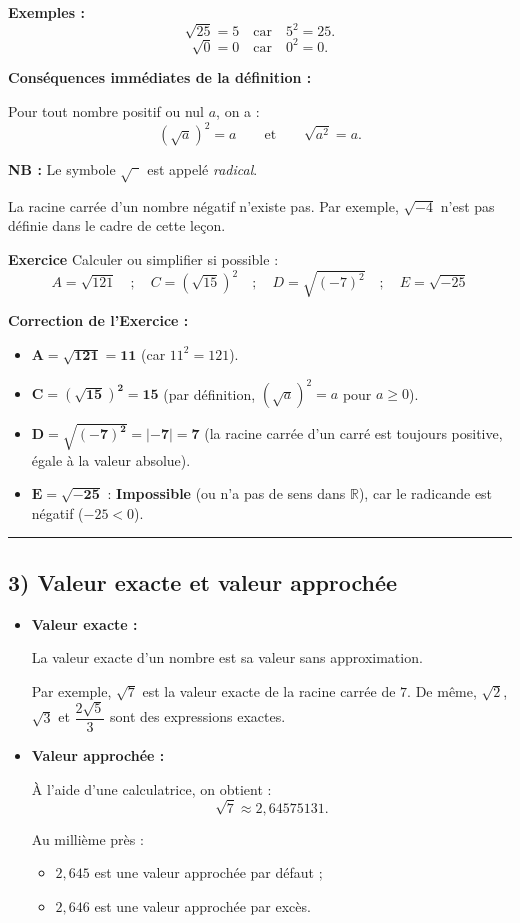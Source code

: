 \documentclass[12pt,a4paper]{article}
\begin{document}
\textbf{Exemples :}
\[
\sqrt{25}=5 \quad \text{car} \quad 5^2=25.
\]
\[
\sqrt{0}=0 \quad \text{car} \quad 0^2=0.
\]

\noindent \textbf{Conséquences immédiates de la définition :}

Pour tout nombre positif ou nul $a$, on a :
\[
(\sqrt{a})^2=a
\qquad \text{et} \qquad
\sqrt{a^2}=a.
\]

\noindent \textbf{NB :}
Le symbole $\sqrt{\phantom{a}}$ est appelé \textit{radical}.

La racine carrée d'un nombre négatif n'existe pas. Par exemple, $\sqrt{-4}$
n'est pas définie dans le cadre de cette leçon.

\noindent \textbf{Exercice } Calculer ou simplifier si possible : 
\[
A = \sqrt{121} \quad ; \quad C = (\sqrt{15})^2 \quad ; \quad D = \sqrt{(-7)^2} \quad ; \quad E = \sqrt{-25}
\]

\vspace{0.3cm}
\noindent \textbf{Correction de l'Exercice :}
\begin{itemize}
    \item $\mathbf{A = \sqrt{121} = 11}$ (car $11^2 = 121$).
    \item $\mathbf{C = (\sqrt{15})^2 = 15}$ (par définition, $(\sqrt{a})^2 = a$ pour $a \ge 0$).
    \item $\mathbf{D = \sqrt{(-7)^2} = |-7| = 7}$ (la racine carrée d'un carré est toujours positive, égale à la valeur absolue).
    \item $\mathbf{E = \sqrt{-25}}$ : \textbf{Impossible} (ou n'a pas de sens dans $\mathbb{R}$), car le radicande est négatif ($-25 < 0$).
\end{itemize}

\vspace{0.4cm}
\hrule
\vspace{0.4cm}
\subsection*{\color{myred} 3) Valeur exacte et valeur approchée}

\begin{itemize}
    \item \textbf{Valeur exacte :}

    La valeur exacte d'un nombre est sa valeur sans approximation.

    Par exemple, $\sqrt{7}$ est la valeur exacte de la racine carrée
    de $7$. De même, $\sqrt{2}$, $\sqrt{3}$ et
    $\dfrac{2\sqrt{5}}{3}$ sont des expressions exactes.

    \item \textbf{Valeur approchée :}

    À l'aide d'une calculatrice, on obtient :
    \[
    \sqrt{7}\approx 2{,}64575131.
    \]

    Au millième près :
    \begin{itemize}
        \item $2{,}645$ est une valeur approchée par défaut ;
        \item $2{,}646$ est une valeur approchée par excès.
    \end{itemize}
\end{itemize}
\end{document}
